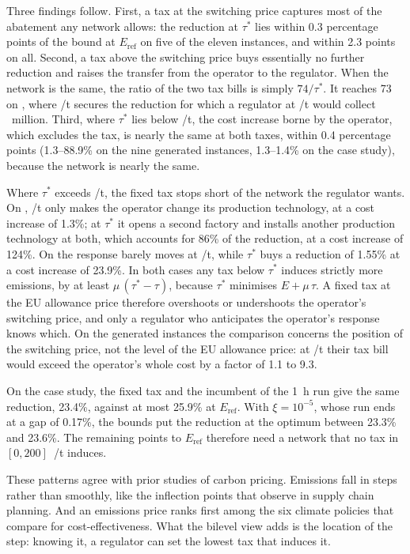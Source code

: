\documentclass[11pt]{article}
\theoremstyle{remark}
\newcommand{\Eref}{E_{\mathrm{ref}}}
\newcommand{\inst}[1]{\texttt{\detokenize{#1}}}
\newcommand{\EUR}{\texteuro}
\begin{document}
Three findings follow. First, a tax at the switching price captures most of the abatement any network allows: the reduction at $\tau^*$ lies within 0.3 percentage points of the bound at $\Eref$ on five of the eleven instances, and within 2.3 points on all. Second, a tax above the switching price buys essentially no further reduction and raises the transfer from the operator to the regulator. When the network is the same, the ratio of the two tax bills is simply $74/\tau^*$. It reaches 73 on \inst{STD_I17_M4_T12}, where \EUR1.0/t secures the reduction for which a regulator at \EUR74/t would collect \EUR3.89~million. Third, where $\tau^*$ lies below \EUR74/t, the cost increase borne by the operator, which excludes the tax, is nearly the same at both taxes, within 0.4 percentage points (1.3--88.9\% on the nine generated instances, 1.3--1.4\% on the case study), because the network is nearly the same.

Where $\tau^*$ exceeds \EUR74/t, the fixed tax stops short of the network the regulator wants. On \inst{STD_I25_M4_T6}, \EUR74/t only makes the operator change its production technology, at a cost increase of 1.3\%; at $\tau^*$ it opens a second factory and installs another production technology at both, which accounts for 86\% of the reduction, at a cost increase of 124\%. On \inst{STD_I33_M8_T6} the response barely moves at \EUR74/t, while $\tau^*$ buys a reduction of 1.55\% at a cost increase of 23.9\%. In both cases any tax below $\tau^*$ induces strictly more emissions, by at least $\mu\,(\tau^* - \tau)$, because $\tau^*$ minimises $E + \mu\,\tau$. A fixed tax at the EU allowance price therefore overshoots or undershoots the operator's switching price, and only a regulator who anticipates the operator's response knows which. On the generated instances the comparison concerns the position of the switching price, not the level of the EU allowance price: at \EUR74/t their tax bill would exceed the operator's whole cost by a factor of 1.1 to 9.3.

On the case study, the fixed tax and the incumbent of the 1~h run give the same reduction, 23.4\%, against at most 25.9\% at $\Eref$. With $\xi = 10^{-5}$, whose run ends at a gap of 0.17\%, the bounds put the reduction at the optimum between 23.3\% and 23.6\%. The remaining points to $\Eref$ therefore need a network that no tax in $[0, 200]$~\EUR/t induces.

These patterns agree with prior studies of carbon pricing. Emissions fall in steps rather than smoothly, like the inflection points that \textcite{zakeri2015carbon} observe in supply chain planning. And an emissions price ranks first among the six climate policies that \textcite{fischer2008environmental} compare for cost-effectiveness. What the bilevel view adds is the location of the step: knowing it, a regulator can set the lowest tax that induces it.
\end{document}
